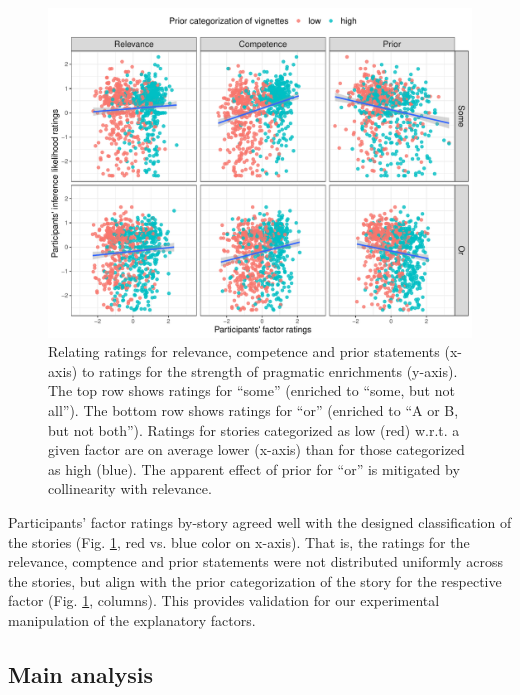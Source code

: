 \documentclass{sp}
\begin{document}
\begin{figure}[h]
	\begin{center}
		\includegraphics[width=1\linewidth]{images/byFactor-byPrior-raw-scatter.pdf}
	\end{center}
	\vspace{-0.3cm}
	\caption{Relating ratings for relevance, competence and prior statements (x-axis) to ratings for the strength of pragmatic enrichments (y-axis). The top row shows ratings for “some” (enriched to “some, but not all”). The bottom row shows ratings for “or” (enriched to “A or B, but not both”). Ratings for stories categorized as low (red) w.r.t. a given factor are on average lower (x-axis) than for those categorized as high (blue). The apparent effect of prior for “or” is mitigated by collinearity with relevance.}
	\label{main-raw-ratings}
\end{figure}

Participants’ factor ratings by-story agreed well with the designed classification of the stories (Fig. \ref{main-raw-ratings}, red vs. blue color on x-axis). That is, the ratings for the relevance, comptence and prior statements were not distributed uniformly across the stories, but align with the prior categorization of the story for the respective factor (Fig. \ref{main-raw-ratings}, columns). This provides validation for our experimental manipulation of the explanatory factors.

\subsection{Main analysis}
\end{document}
